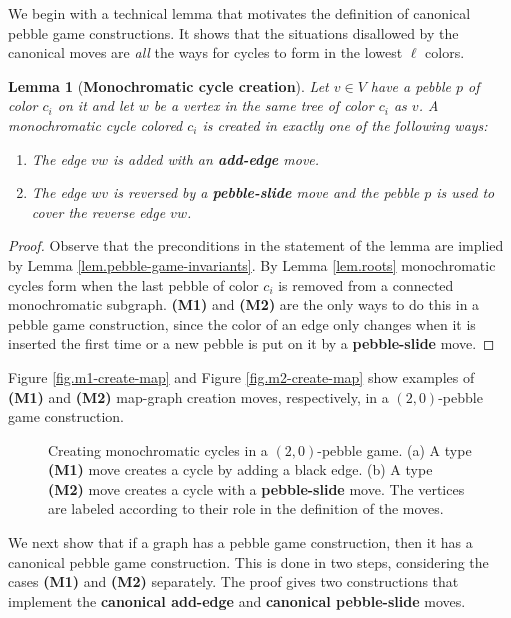 \documentclass[Svgc,nospthms]{Svgc}
\newcommand{\reffig}[1]{Figure \ref{fig.#1}}
\newtheorem{lemma}[theorem]{Lemma}
\newcommand{\reflem}[1]{Lemma \ref{lem.#1}}
\newcommand{\labellem}[1]{\label{lem.#1}}
\begin{document}
We begin with a technical lemma that motivates the definition of canonical 
pebble game constructions.  It shows that the situations disallowed by 
the canonical moves are {\it all} the ways for cycles to form in 
the lowest $\ell$ colors.

\begin{lemma}[{\bf Monochromatic cycle creation}]\labellem{how-maps-form}
	Let $v\in V$ have a pebble $p$ of color $c_{i}$ on it and let $w$
	be a vertex in the same tree of color $c_i$ as $v$.	A  monochromatic cycle colored $c_{i}$ is 
	created in exactly one of the following ways: 
	\begin{enumerate}
		\item[{\bf (M1)}] The edge $vw$ is added with an {\bf add-edge} move.
		\item[{\bf (M2)}] The edge $wv$ is reversed by a {\bf pebble-slide} move and 
		the pebble $p$ is used to cover the reverse edge $vw$.	
	\end{enumerate}
	\end{lemma}
	 \begin{proof}
	 	Observe that the preconditions in the statement of the lemma are implied by
	 	 \reflem{pebble-game-invariants}. By \reflem{roots}  monochromatic 
	 	cycles form when the last pebble of color $c_{i}$ is removed from a 
	 	connected monochromatic subgraph. {\bf (M1)} and {\bf (M2)} 
	 	are the only ways to do this in a pebble game construction, since the 
		color of an edge only changes when it is inserted the first time 
		or a new pebble is put on it by a {\bf pebble-slide} move.
	  \end{proof}
	
	\reffig{m1-create-map} and \reffig{m2-create-map} show examples of 
	{\bf (M1)} and {\bf (M2)} map-graph creation moves, respectively, 
	in a $(2,0)$-pebble game construction.
	
	\begin{figure}[htbp]
		\centering
		\caption{Creating monochromatic cycles in a $(2,0)$-pebble game. (a) A type {\bf (M1)} move creates a cycle by adding a black edge.  (b) A type {\bf (M2)} move creates a cycle with a {\bf pebble-slide} move.
		The vertices are labeled according to their role in the definition of the moves.}
		\end{figure}
	
	We next show that if a graph has a pebble game construction, then it has a canonical pebble 
	game construction.  This is done in two steps, considering the cases {\bf (M1)} and {\bf (M2)}
	separately.  The proof gives two constructions that implement the {\bf canonical add-edge}
	and {\bf canonical pebble-slide} moves.
	
\end{document}
